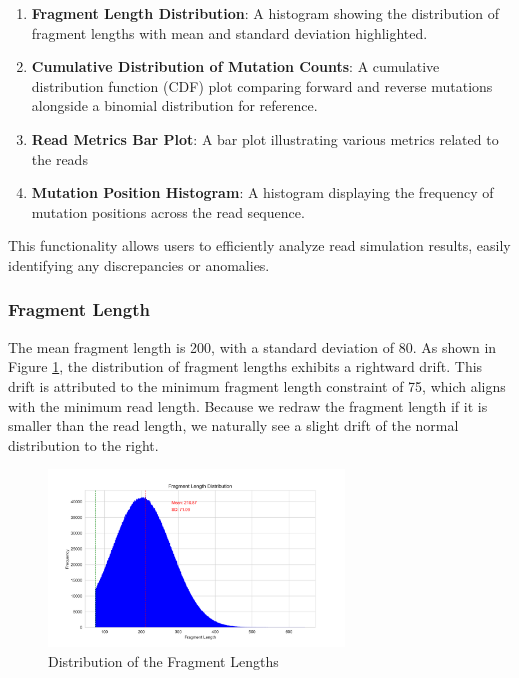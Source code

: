 \documentclass{article}
\begin{document}
    \begin{enumerate}
        \item \textbf{Fragment Length Distribution}: A histogram showing the distribution of fragment lengths with mean and standard deviation highlighted.
        \item \textbf{Cumulative Distribution of Mutation Counts}: A cumulative distribution function (CDF) plot comparing forward and reverse mutations alongside a binomial distribution for reference.
        \item \textbf{Read Metrics Bar Plot}: A bar plot illustrating various metrics related to the reads
        \item \textbf{Mutation Position Histogram}: A histogram displaying the frequency of mutation positions across the read sequence.
    \end{enumerate}

    This functionality allows users to efficiently analyze read simulation results, easily identifying any discrepancies or anomalies.

    \subsubsection{Fragment Length}
    The mean fragment length is 200, with a standard deviation of 80. As shown in Figure \ref{fig:fragment-length-dist}, the distribution of fragment lengths exhibits a rightward drift. This drift is attributed to the minimum fragment length constraint of 75, which aligns with the minimum read length. Because we redraw the fragment length if it is smaller than the read length, we naturally see a slight drift of the normal distribution to the right.


    \begin{figure}
        \centering
        \includegraphics[width=0.7\textwidth]{figures/readsimulator/fragment_length_distribution}
        \caption{Distribution of the Fragment Lengths}
        \label{fig:fragment-length-dist}
    \end{figure}
\end{document}
